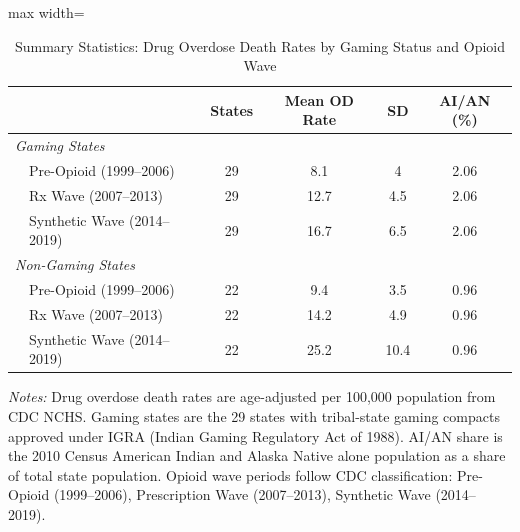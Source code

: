 \begin{table}[htbp]
\centering
\caption{Summary Statistics: Drug Overdose Death Rates by Gaming Status and Opioid Wave}
\label{tab:summary}
\begin{adjustbox}{max width=\textwidth}
\begin{tabular}{llcccc}
\hline\hline
 & & States & Mean OD Rate & SD & AI/AN (\%) \\
\hline
\multicolumn{6}{l}{\textit{Gaming States}} \\
  & Pre-Opioid (1999--2006) & 29 & 8.1 & 4 & 2.06 \\
  & Rx Wave (2007--2013) & 29 & 12.7 & 4.5 & 2.06 \\
  & Synthetic Wave (2014--2019) & 29 & 16.7 & 6.5 & 2.06 \\
\hline
\multicolumn{6}{l}{\textit{Non-Gaming States}} \\
  & Pre-Opioid (1999--2006) & 22 & 9.4 & 3.5 & 0.96 \\
  & Rx Wave (2007--2013) & 22 & 14.2 & 4.9 & 0.96 \\
  & Synthetic Wave (2014--2019) & 22 & 25.2 & 10.4 & 0.96 \\
\hline
\end{tabular}
\end{adjustbox}
\begin{tablenotes}[flushleft]\footnotesize
\item \textit{Notes:} Drug overdose death rates are age-adjusted per 100,000 population from CDC NCHS. Gaming states are the 29 states with tribal-state gaming compacts approved under IGRA (Indian Gaming Regulatory Act of 1988). AI/AN share is the 2010 Census American Indian and Alaska Native alone population as a share of total state population. Opioid wave periods follow CDC classification: Pre-Opioid (1999--2006), Prescription Wave (2007--2013), Synthetic Wave (2014--2019).
\end{tablenotes}
\end{table}
